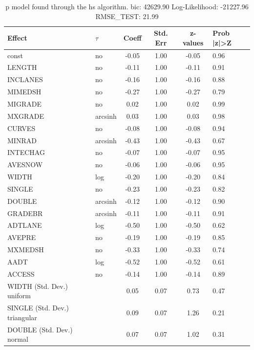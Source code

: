 \begin{table}
	\caption{p model found through the hs algorithm. bic: 42629.90 Log-Likelihood: -21227.96 RMSE_TEST: 21.99}
	\begin{center}
		\begin{tabular}{|l|l|c|c|c|l|}
			\hline
			Effect & $\tau$ & Coeff & Std. Err & z-values & Prob |z|>Z \\
			\hline
			const & no & -0.05 & 1.00 & -0.05 & 0.96 \\
			\hline
			LENGTH & no & -0.11 & 1.00 & -0.11 & 0.91 \\
			\hline
			INCLANES & no & -0.16 & 1.00 & -0.16 & 0.88 \\
			\hline
			MIMEDSH & no & -0.27 & 1.00 & -0.27 & 0.79 \\
			\hline
			MIGRADE & no & 0.02 & 1.00 & 0.02 & 0.99 \\
			\hline
			MXGRADE & arcsinh & 0.03 & 1.00 & 0.03 & 0.98 \\
			\hline
			CURVES & no & -0.08 & 1.00 & -0.08 & 0.94 \\
			\hline
			MINRAD & arcsinh & -0.43 & 1.00 & -0.43 & 0.67 \\
			\hline
			INTECHAG & no & -0.07 & 1.00 & -0.07 & 0.95 \\
			\hline
			AVESNOW & no & -0.06 & 1.00 & -0.06 & 0.95 \\
			\hline
			WIDTH & log & -0.20 & 1.00 & -0.20 & 0.84 \\
			\hline
			SINGLE & no & -0.23 & 1.00 & -0.23 & 0.82 \\
			\hline
			DOUBLE & arcsinh & -0.12 & 1.00 & -0.12 & 0.90 \\
			\hline
			GRADEBR & arcsinh & -0.11 & 1.00 & -0.11 & 0.91 \\
			\hline
			ADTLANE & log & -0.50 & 1.00 & -0.50 & 0.62 \\
			\hline
			AVEPRE & no & -0.19 & 1.00 & -0.19 & 0.85 \\
			\hline
			MXMEDSH & no & -0.33 & 1.00 & -0.33 & 0.74 \\
			\hline
			AADT & log & -0.52 & 1.00 & -0.52 & 0.61 \\
			\hline
			ACCESS & no & -0.14 & 1.00 & -0.14 & 0.89 \\
			\hline
			WIDTH (Std. Dev.) uniform &  & 0.05 & 0.07 & 0.73 & 0.47 \\
			\hline
			SINGLE (Std. Dev.) triangular &  & 0.09 & 0.07 & 1.26 & 0.21 \\
			\hline
			DOUBLE (Std. Dev.) normal &  & 0.07 & 0.07 & 1.02 & 0.31 \\

\end{tabular}
\end{center}
\end{table}
